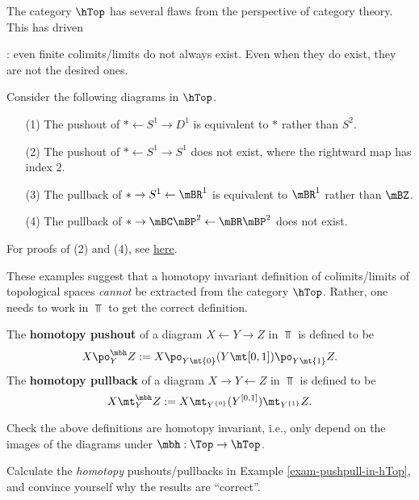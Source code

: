 


\ssec{}

The category $\hTop$ has several flaws from the perspective of category theory. This has driven 



: even finite colimits/limits do not always exist. Even when they do exist, they are not the desired ones.

\begin{exam}
	\label{exam-pushpull-in-hTop}
	Consider the following diagrams in $\hTop$.
	\begin{itemize}
		\item[(1)]
			The pushout of $* \gets S^1 \to D^1$ is equivalent to $*$ rather than $S^2$.
		\item[(2)]
			The pushout of $* \gets S^1 \to S^1$ does not exist, where the rightward map has index $2$.
		\item[(3)]
			The pullback of $* \to S^1 \gets \mBR^1$ is equivalent to $\mBR^1$ rather than $\mBZ$. 
		\item[(4)]
			The pullback of $* \to \mBC\mBP^2 \gets \mBR\mBP^2$ does not exist.
	\end{itemize}
	For proofs of (2) and (4), see \href{https://mathoverflow.net/q/120572}{here}.
\end{exam}

\ssec{}

These examples suggest that a homotopy invariant definition of colimits/limits of topological spaces \emph{cannot} be extracted from the category $\hTop$. Rather, one needs to work in $\Top$ to get the correct definition.

\begin{defn}
	The \textbf{homotopy pushout} of a diagram $X \gets Y \to Z$ in $\Top$ is defined to be
	\[
		X \po_Y^\mbh Z := X \po_{Y\mt \{0\}} (Y\mt [0,1]) \po_{Y\mt \{1\}} Z.
	\]
	The \textbf{homotopy pullback} of a diagram $X \to Y \gets Z$ in $\Top$ is defined to be
	\[
		X \mt_Y^\mbh Z := X \mt_{Y^{\{0\}}} (Y^{[0,1]}) \mt_{Y^{\{1\}}} Z.
	\]
\end{defn}

\begin{exe}
	Check the above definitions are homotopy invariant, i.e., only depend on the images of the diagrams under $\mbh:\Top \to \hTop$.
\end{exe}

\begin{exe}
	Calculate the \emph{homotopy} pushouts/pullbacks in Example \ref{exam-pushpull-in-hTop}, and convince yourself why the results are ``correct''.
\end{exe}



